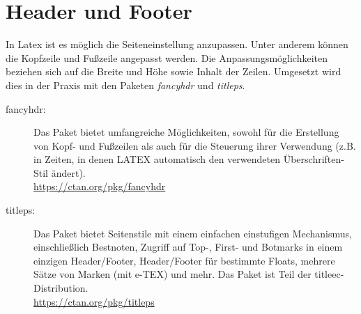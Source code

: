 \chapter{Header und Footer}
In Latex ist es möglich die Seiteneinstellung anzupassen. Unter anderem können die Kopfzeile und Fußzeile angepasst werden. Die Anpassungsmöglichkeiten beziehen sich auf die Breite und Höhe sowie Inhalt der Zeilen. Umgesetzt wird dies in der Praxis mit den Paketen \emph{fancyhdr} und \emph{titleps}. 

\begin{description}
	\item[fancyhdr:] Das Paket bietet umfangreiche Möglichkeiten, sowohl für die Erstellung von Kopf- und Fußzeilen als auch für die Steuerung ihrer Verwendung (z.B. in Zeiten, in denen LATEX automatisch den verwendeten Überschriften-Stil ändert).\\
	\url{https://ctan.org/pkg/fancyhdr}
	\item[titleps:] Das Paket bietet Seitenstile mit einem einfachen einstufigen Mechanismus, einschließlich Bestnoten, Zugriff auf Top-, First- und Botmarks in einem einzigen Header/Footer, Header/Footer für bestimmte Floats, mehrere Sätze von Marken (mit e-TEX) und mehr.
	Das Paket ist Teil der titleec-Distribution.\\
	\url{https://ctan.org/pkg/titleps}
\end{description}

